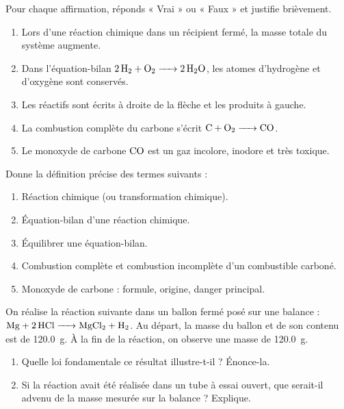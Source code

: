 \documentclass[11pt]{article}
\newcommand{\cle}[1]{{\popxbold\color{popdark}#1}}
\begin{document}
\begin{exercice}
Pour chaque affirmation, réponds « Vrai » ou « Faux » et justifie brièvement.
\begin{enumerate}
    \item Lors d'une réaction chimique dans un récipient fermé, la masse totale du système augmente.
    \item Dans l'équation-bilan $\ce{2H2 + O2 -> 2H2O}$, les atomes d'hydrogène et d'oxygène sont conservés.
    \item Les \cle{réactifs} sont écrits à droite de la flèche et les \cle{produits} à gauche.
    \item La combustion complète du carbone s'écrit $\ce{C + O2 -> CO}$.
    \item Le monoxyde de carbone $\ce{CO}$ est un gaz incolore, inodore et très toxique.
\end{enumerate}
\end{exercice}

\begin{exercice}
Donne la définition précise des termes suivants :
\begin{enumerate}
    \item \cle{Réaction chimique} (ou transformation chimique).
    \item \cle{Équation-bilan} d'une réaction chimique.
    \item \cle{Équilibrer} une équation-bilan.
    \item \cle{Combustion complète} et \cle{combustion incomplète} d'un combustible carboné.
    \item \cle{Monoxyde de carbone} : formule, origine, danger principal.
\end{enumerate}
\end{exercice}

\begin{exercice}
On réalise la réaction suivante dans un ballon fermé posé sur une balance : $\ce{Mg + 2HCl -> MgCl2 + H2}$.
Au départ, la masse du ballon et de son contenu est de \SI{120,0}{g}. À la fin de la réaction, on observe une masse de \SI{120,0}{g}.
\begin{enumerate}
    \item Quelle loi fondamentale ce résultat illustre-t-il ? Énonce-la.
    \item Si la réaction avait été réalisée dans un tube à essai ouvert, que serait-il advenu de la masse mesurée sur la balance ? Explique.
\end{enumerate}
\end{exercice}
\end{document}
